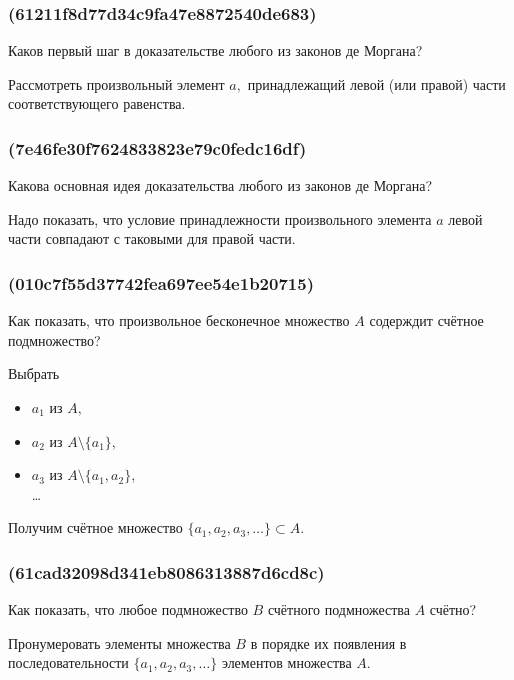 \documentclass[11pt, a5paper]{article}
\newenvironment{note}[1]{\subsubsection{(#1)}}{}
\newenvironment{cloze}[2][\ldots]{\begin{leftbar}}{\end{leftbar}}
\begin{document}
    \begin{note}{61211f8d77d34c9fa47e8872540de683}
        Каков первый шаг в доказательстве любого из законов де Моргана?

        \begin{cloze}{1}
            Рассмотреть произвольный элемент \( a, \) принадлежащий левой (или
            правой) части соответствующего равенства.
        \end{cloze}
    \end{note}


    \begin{note}{7e46fe30f7624833823e79c0fedc16df}
        Какова основная идея доказательства любого из законов де Моргана?

        \begin{cloze}{1}
            Надо показать, что условие принадлежности произвольного элемента \( a \)
            левой части совпадают с таковыми для правой части.
        \end{cloze}
    \end{note}

    \begin{note}{010c7f55d37742fea697ee54e1b20715}
        Как показать, что произвольное бесконечное множество \( A \) содерждит
        счётное подмножество?

        \begin{cloze}{1}
            Выбрать
            \begin{itemize}
                \item \( a_1 \) из \( A, \)
                \item \( a_2 \) из \( A \setminus \{ a_1 \}, \)
                \item \( a_3 \) из \( A \setminus \{ a_1, a_2 \}, \) \\
                    \dots
            \end{itemize}
            Получим счётное множество \( \{ a_1, a_2, a_3, \ldots \} \subset A.
            \)
        \end{cloze}
    \end{note}

    \begin{note}{61cad32098d341eb8086313887d6cd8c}
        Как показать, что любое подмножество \( B \) счётного подмножества \( A
        \) счётно?

        \begin{cloze}{1}
            Пронумеровать элементы множества \( B \) в порядке их появления в
            последовательности \( \{ a_1, a_2, a_3, \ldots  \} \) элементов
            множества \( A. \)
        \end{cloze}
    \end{note}
\end{document}
